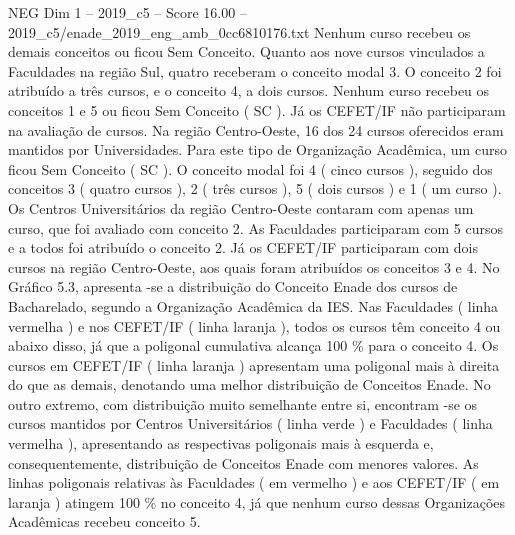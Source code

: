 \begin{textsample}{NEG Dim 1 – 2019\_c5 – Score 16.00 – 2019\_c5/enade\_2019\_eng\_amb\_0cc6810176.txt}
Nenhum curso recebeu os demais conceitos ou ficou Sem Conceito.
Quanto aos nove cursos vinculados a Faculdades na região Sul, quatro receberam o conceito modal 3.
O conceito 2 foi atribuído a três cursos, e o conceito 4, a dois cursos.
Nenhum curso recebeu os conceitos 1 e 5 ou ficou Sem Conceito ( SC ).
Já os CEFET/IF não participaram na avaliação de cursos.
Na região Centro-Oeste, 16 dos 24 cursos oferecidos eram mantidos por Universidades.
Para este tipo de Organização Acadêmica, um curso ficou Sem Conceito ( SC ).
O conceito modal foi 4 ( cinco cursos ), seguido dos conceitos 3 ( quatro cursos ), 2 ( três cursos ), 5 ( dois cursos ) e 1 ( um curso ).
Os Centros Universitários da região Centro-Oeste contaram com apenas um curso, que foi avaliado com conceito 2.
As Faculdades participaram com 5 cursos e a todos foi atribuído o conceito 2.
Já os CEFET/IF participaram com dois cursos na região Centro-Oeste, aos quais foram atribuídos os conceitos 3 e 4.
No Gráfico 5.3, apresenta -se a distribuição do Conceito Enade dos cursos de Bacharelado, segundo a Organização Acadêmica da IES.
Nas Faculdades ( linha vermelha ) e nos CEFET/IF ( linha laranja ), todos os cursos têm conceito 4 ou abaixo disso, já que a poligonal cumulativa alcança 100 \% para o conceito 4.
Os cursos em CEFET/IF ( linha laranja ) apresentam uma poligonal mais à direita do que as demais, denotando uma melhor distribuição de Conceitos Enade.
No outro extremo, com distribuição muito semelhante entre si, encontram -se os cursos mantidos por Centros Universitários ( linha verde ) e Faculdades ( linha vermelha ), apresentando as respectivas poligonais mais à esquerda e, consequentemente, distribuição de Conceitos Enade com menores valores.
As linhas poligonais relativas às Faculdades ( em vermelho ) e aos CEFET/IF ( em laranja ) atingem 100 \% no conceito 4, já que nenhum curso dessas Organizações Acadêmicas recebeu conceito 5.

\end{textsample}
